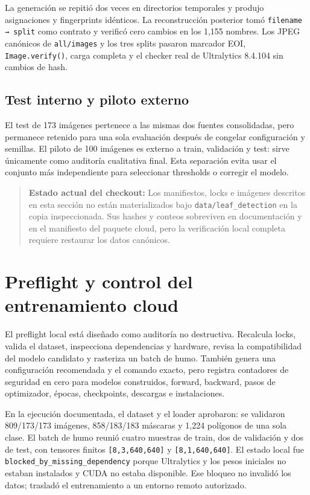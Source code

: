 \documentclass[11pt,a4paper]{article}
\begin{document}
La generación se repitió dos veces en directorios temporales y produjo asignaciones y fingerprints idénticos. La reconstrucción posterior tomó \texttt{filename → split} como contrato y verificó cero cambios en los 1,155 nombres. Los JPEG canónicos de \texttt{all/images} y los tres splits pasaron marcador EOI, \texttt{Image.verify()}, carga completa y el checker real de Ultralytics 8.4.104 sin cambios de hash.


\subsection{Test interno y piloto externo}

El test de 173 imágenes pertenece a las mismas dos fuentes consolidadas, pero permanece retenido para una sola evaluación después de congelar configuración y semillas. El piloto de 100 imágenes es externo a train, validación y test: sirve únicamente como auditoría cualitativa final. Esta separación evita usar el conjunto más independiente para seleccionar thresholds o corregir el modelo.


\begin{quote}\textbf{Estado actual del checkout:} Los manifiestos, locks e imágenes descritos en esta sección no están materializados bajo \texttt{data/leaf\_detection} en la copia inspeccionada. Sus hashes y conteos sobreviven en documentación y en el manifiesto del paquete cloud, pero la verificación local completa requiere restaurar los datos canónicos.\end{quote}

\section{Preflight y control del entrenamiento cloud}

El preflight local está diseñado como auditoría no destructiva. Recalcula locks, valida el dataset, inspecciona dependencias y hardware, revisa la compatibilidad del modelo candidato y rasteriza un batch de humo. También genera una configuración recomendada y el comando exacto, pero registra contadores de seguridad en cero para modelos construidos, forward, backward, pasos de optimizador, épocas, checkpoints, descargas e instalaciones.


En la ejecución documentada, el dataset y el loader aprobaron: se validaron 809/173/173 imágenes, 858/183/183 máscaras y 1,224 polígonos de una sola clase. El batch de humo reunió cuatro muestras de train, dos de validación y dos de test, con tensores finitos \texttt{[8,3,640,640]} y \texttt{[8,1,640,640]}. El estado local fue \texttt{blocked\_by\_missing\_dependency} porque Ultralytics y los pesos iniciales no estaban instalados y CUDA no estaba disponible. Ese bloqueo no invalidó los datos; trasladó el entrenamiento a un entorno remoto autorizado.
\end{document}
